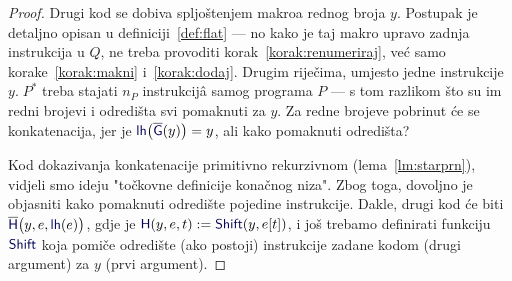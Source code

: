 \begin{proof}
Drugi kod se dobiva spljoštenjem makroa rednog broja $y$. Postupak je detaljno opisan u definiciji~\ref{def:flat} --- no kako je taj makro upravo zadnja instrukcija u $Q$, ne treba provoditi korak~\eqref{korak:renumeriraj}, već samo korake~\eqref{korak:makni} i~\eqref{korak:dodaj}. Drugim riječima, umjesto jedne instrukcije $y.\;P^*$ treba stajati $n_P$ instrukcijâ samog programa $P$ --- s tom razlikom što su im redni brojevi i odredišta svi pomaknuti za $y$. Za redne brojeve pobrinut će se konkatenacija, jer je $\f{lh}\bigl(\overline{\f G}(y)\bigr)=y$, ali kako pomaknuti odredišta?

Kod dokazivanja konkatenacije primitivno rekurzivnom (lema~\ref{lm:starprn}), vidjeli smo ideju "točkovne definicije konačnog niza". Zbog toga, dovoljno je objasniti kako pomaknuti odredište pojedine instrukcije. Dakle, drugi kod će biti $\overline{\f H}\bigl(y,e,\f{lh}(e)\bigr)$, gdje je $\f H(y,e,t):=\f{Shift}(y,e[t])$, i još trebamo definirati funkciju $\f{Shift}$ koja pomiče odredište (ako postoji) instrukcije zadane kodom (drugi argument) za $y$ (prvi argument).


\end{proof}
